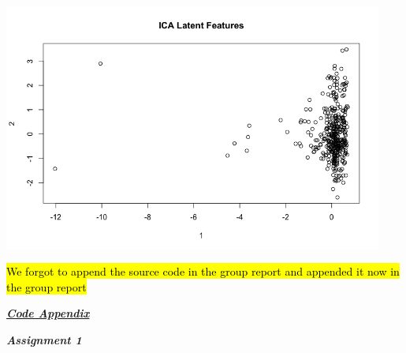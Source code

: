\documentclass[a4paper,10pt]{article}
\begin{document}
\begin{center}
  \includegraphics[width=125mm,scale=0.10]{Scoreplot_Latent_Features_ICA.png}
\end{center}
\par
\vspace{0.5cm}
\hl{We forgot to append the source code in the group report and appended it now in the group report} \par
\huge \textbf{\emph{\underline{Code Appendix}}} \par
\large \textit{\textbf{Assignment 1}} \par
\end{document}
